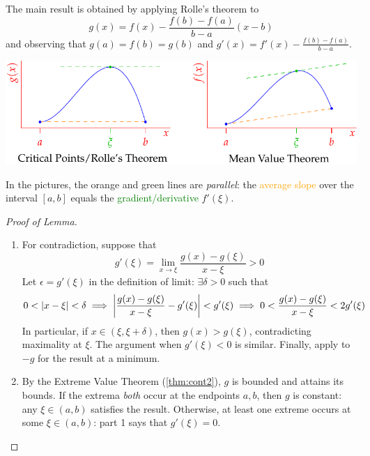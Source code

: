 The main result is obtained by applying Rolle's theorem to
\[
	g(x)=f(x)-\frac{f(b)-f(a)}{b-a}(x-b)
\]
and observing that $g(a)=f(b)=g(b)$ and $g'(x)=f'(x)-\frac{f(b)-f(a)}{b-a}$.

\begin{center}
	\includegraphics[scale=0.95]{mvt}
\end{center}

In the pictures, the orange and green lines are \emph{parallel}: the \textcolor{orange}{average slope} over the interval $[a,b]$ equals the \textcolor{Green}{gradient/derivative} $f'(\xi)$.

\begin{proof}[Proof of Lemma]
	\begin{enumerate}\itemsep0pt
	  \item For contradiction, suppose that
		\[
			g'(\xi)=\lim_{x\to \xi}\frac{g(x)-g(\xi)}{x-\xi}>0
		\]
		Let $\epsilon=g'(\xi)$ in the definition of limit: $\exists\delta>0$ such that
		\[
			0<\left| x-\xi\right|<\delta
			\implies\left| \frac{g(x)-g(\xi)}{x-\xi}-g'(\xi)\right|<g'(\xi)
			\implies 0<\frac{g(x)-g(\xi)}{x-\xi}<2g'(\xi)
		\]
		In particular, if $x\in(\xi,\xi+\delta)$, then $g(x)>g(\xi)$, contradicting maximality at $\xi$.\smallbreak
		The argument when $g'(\xi)<0$ is similar. Finally, apply to $-g$ for the result at a minimum.
	  \item By the Extreme Value Theorem (\ref{thm:cont2}), $g$ is bounded and attains its bounds.
	  If the extrema \emph{both} occur at the endpoints $a,b$, then $g$ is constant: any $\xi\in(a,b)$ satisfies the result.	Otherwise, at least one extreme occurs at some $\xi\in(a,b)$: part 1 says that $g'(\xi)=0$.\hfill\qedhere
	\end{enumerate}
\end{proof}
\goodbreak


